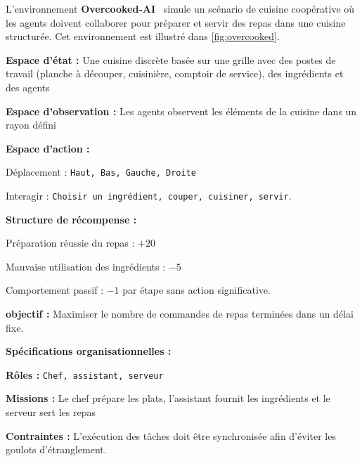 L'environnement \textbf{Overcooked-AI}~\cite{Carroll2019} simule un scénario de cuisine coopérative où les agents doivent collaborer pour préparer et servir des repas dans une cuisine structurée. Cet environnement est illustré dans \autoref{fig:overcooked}.

\begin{enumerate*}[label={\roman*)}, itemjoin={; \quad}]
  \item \textbf{Espace d'état :} Une cuisine discrète basée sur une grille avec des postes de travail (planche à découper, cuisinière, comptoir de service), des ingrédients et des agents
  \item \textbf{Espace d'observation :} Les agents observent les éléments de la cuisine dans un rayon défini
  \item \textbf{Espace d'action :}
  \begin{enumerate*}[label={\roman*)}, itemjoin={; \quad}]
    \item Déplacement : \texttt{Haut, Bas, Gauche, Droite}
    \item Interagir : \texttt{Choisir un ingrédient, couper, cuisiner, servir}.
  \end{enumerate*}
  \item \textbf{Structure de récompense :}
  \begin{enumerate*}[label={\roman*)}, itemjoin={; \quad}]
    \item Préparation réussie du repas : $+20$
    \item Mauvaise utilisation des ingrédients : $-5$
    \item Comportement passif : $-1$ par étape sans action significative.
  \end{enumerate*}
  \item \textbf{objectif :} Maximiser le nombre de commandes de repas terminées dans un délai fixe.
\end{enumerate*}
%
\textbf{Spécifications organisationnelles :}
\begin{enumerate*}[label={\roman*)}, itemjoin={; \quad}]
  \item \textbf{Rôles :} \texttt{Chef, assistant, serveur}
  \item \textbf{Missions :} Le chef prépare les plats, l'assistant fournit les ingrédients et le serveur sert les repas
  \item \textbf{Contraintes :} L'exécution des tâches doit être synchronisée afin d'éviter les goulots d'étranglement.
\end{enumerate*}

